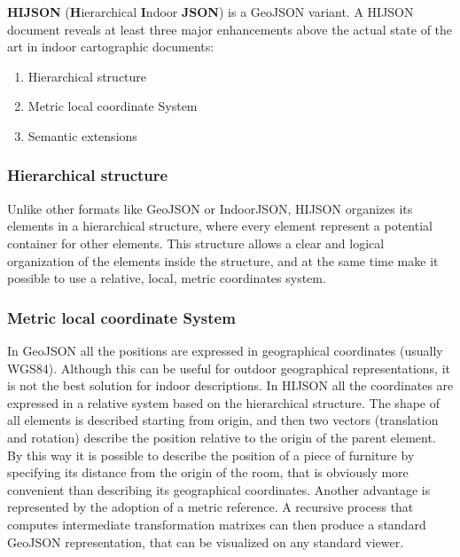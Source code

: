 \documentclass[]{article}
\begin{document}
\textbf{HIJSON} (\textbf{H}ierarchical \textbf{I}ndoor \textbf{JSON}) is
a GeoJSON variant. A HIJSON document reveals at least three major
enhancements above the actual state of the art in indoor cartographic
documents:

\begin{enumerate}
\def\labelenumi{\arabic{enumi}.}
\itemsep1pt\parskip0pt
\item
  Hierarchical structure
\item
  Metric local coordinate System
\item
  Semantic extensions
\end{enumerate}

\subsubsection{Hierarchical structure}\label{hierarchical-structure}

Unlike other formats like GeoJSON or IndoorJSON, HIJSON organizes its
elements in a hierarchical structure, where every element represent a
potential container for other elements. This structure allows a clear
and logical organization of the elements inside the structure, and at
the same time make it possible to use a relative, local, metric
coordinates system.

\subsubsection{Metric local coordinate
System}\label{metric-local-coordinate-system}

In GeoJSON all the positions are expressed in geographical coordinates
(usually WGS84). Although this can be useful for outdoor geographical
representations, it is not the best solution for indoor descriptions. In
HIJSON all the coordinates are expressed in a relative system based on
the hierarchical structure. The shape of all elements is described
starting from origin, and then two vectors (translation and rotation)
describe the position relative to the origin of the parent element. By
this way it is possible to describe the position of a piece of furniture
by specifying its distance from the origin of the room, that is
obviously more convenient than describing its geographical coordinates.
Another advantage is represented by the adoption of a metric reference.
A recursive process that computes intermediate transformation matrixes
can then produce a standard GeoJSON representation, that can be
visualized on any standard viewer.
\end{document}
